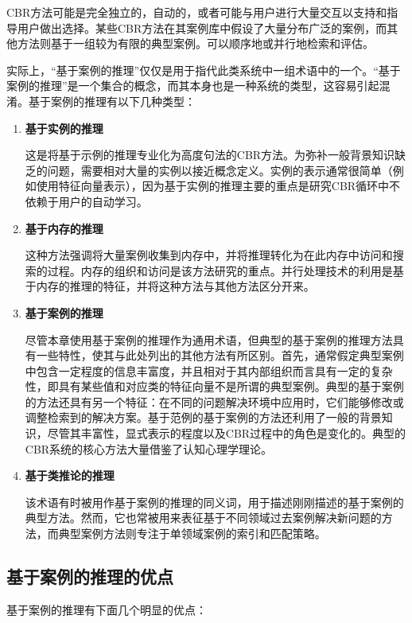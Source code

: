 CBR方法可能是完全独立的，自动的，或者可能与用户进行大量交互以支持和指导用户做出选择。某些CBR方法在其案例库中假设了大量分布广泛的案例，而其他方法则基于一组较为有限的典型案例。可以顺序地或并行地检索和评估。

实际上，“基于案例的推理”仅仅是用于指代此类系统中一组术语中的一个。“基于案例的推理”是一个集合的概念，而其本身也是一种系统的类型，这容易引起混淆。基于案例的推理有以下几种类型：

\begin{enumerate}
  \item \textbf{基于实例的推理}
  
  这是将基于示例的推理专业化为高度句法的CBR方法。为弥补一般背景知识缺乏的问题，需要相对大量的实例以接近概念定义。实例的表示通常很简单（例如使用特征向量表示），因为基于实例的推理主要的重点是研究CBR循环中不依赖于用户的自动学习。
  \item \textbf{基于内存的推理}
  
  这种方法强调将大量案例收集到内存中，并将推理转化为在此内存中访问和搜索的过程。内存的组织和访问是该方法研究的重点。并行处理技术的利用是基于内存的推理的特征，并将这种方法与其他方法区分开来。
  \item \textbf{基于案例的推理}
  
  尽管本章使用基于案例的推理作为通用术语，但典型的基于案例的推理方法具有一些特性，使其与此处列出的其他方法有所区别。首先，通常假定典型案例中包含一定程度的信息丰富度，并且相对于其内部组织而言具有一定的复杂性，即具有某些值和对应类的特征向量不是所谓的典型案例。典型的基于案例的方法还具有另一个特征：在不同的问题解决环境中应用时，它们能够修改或调整检索到的解决方案。基于范例的基于案例的方法还利用了一般的背景知识，尽管其丰富性，显式表示的程度以及CBR过程中的角色是变化的。典型的CBR系统的核心方法大量借鉴了认知心理学理论。
  
  \item \textbf{基于类推论的推理}
  
  该术语有时被用作基于案例的推理的同义词，用于描述刚刚描述的基于案例的典型方法。然而，它也常被用来表征基于不同领域过去案例解决新问题的方法，而典型案例方法则专注于单领域案例的索引和匹配策略。
\end{enumerate}

\subsection{基于案例的推理的优点}
基于案例的推理有下面几个明显的优点：

